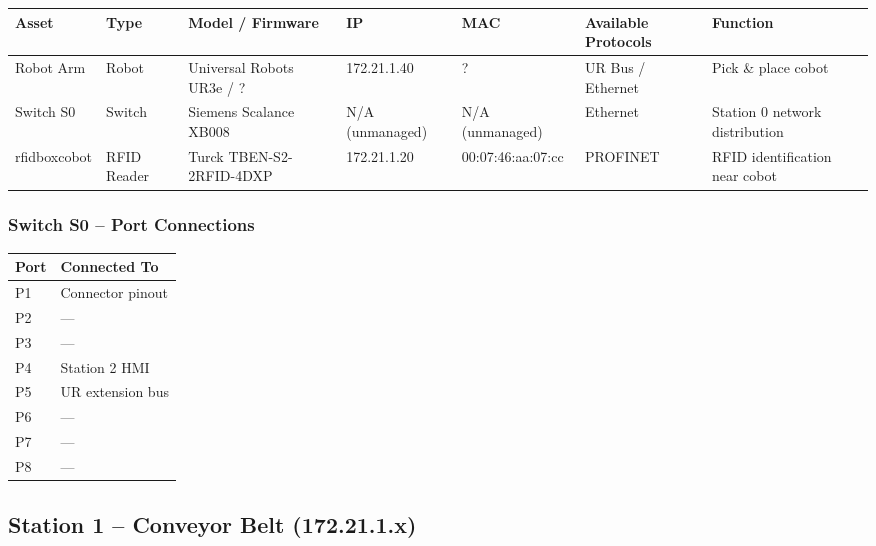 \begin{adjustbox}{max width=\textwidth}
\begin{tabular}{lllllll}
\toprule
\textbf{Asset} & \textbf{Type} & \textbf{Model / Firmware} & \textbf{IP} & \textbf{MAC} & \textbf{Available Protocols} & \textbf{Function} \\
\midrule
Robot Arm    & Robot       & Universal Robots UR3e / ? & 172.21.1.40     & ?                 & UR Bus / Ethernet   & Pick \& place cobot \\
Switch S0    & Switch      & Siemens Scalance XB008    & N/A (unmanaged) & N/A (unmanaged)   & Ethernet            & Station 0 network distribution \\
rfidboxcobot & RFID Reader & Turck TBEN-S2-2RFID-4DXP  & 172.21.1.20     & 00:07:46:aa:07:cc & PROFINET            & RFID identification near cobot \\
\bottomrule
\end{tabular}
\end{adjustbox}

\subsubsection{Switch S0 – Port Connections}

\begin{tabular}{ll}
\toprule
\textbf{Port} & \textbf{Connected To} \\
\midrule
P1 & Connector pinout \\
P2 & — \\
P3 & — \\
P4 & Station 2 HMI \\
P5 & UR extension bus \\
P6 & — \\
P7 & — \\
P8 & — \\
\bottomrule
\end{tabular}

\subsection{Station 1 – Conveyor Belt (172.21.1.x)}


